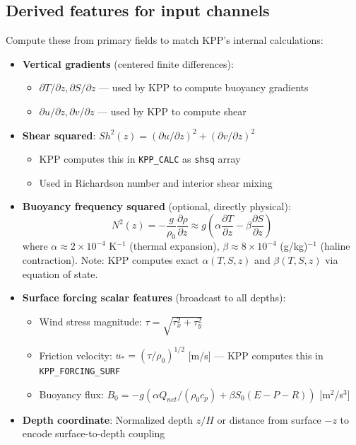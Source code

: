\documentclass[11pt, a4paper]{article}
\begin{document}
\subsection{Derived features for input channels}

Compute these from primary fields to match KPP's internal calculations:

\begin{itemize}
    \item \textbf{Vertical gradients} (centered finite differences):
    \begin{itemize}
        \item $\partial T/\partial z, \partial S/\partial z$ — used by KPP to compute buoyancy gradients
        \item $\partial u/\partial z, \partial v/\partial z$ — used by KPP to compute shear
    \end{itemize}

    \item \textbf{Shear squared}: $Sh^2(z) = (\partial u/\partial z)^2 + (\partial v/\partial z)^2$
    \begin{itemize}
        \item KPP computes this in \texttt{KPP\_CALC} as \texttt{shsq} array
        \item Used in Richardson number and interior shear mixing
    \end{itemize}

    \item \textbf{Buoyancy frequency squared} (optional, directly physical):
    \begin{equation}
    N^2(z) = -\frac{g}{\rho_0}\frac{\partial \rho}{\partial z} \approx g(\alpha \frac{\partial T}{\partial z} - \beta \frac{\partial S}{\partial z})
    \end{equation}
    where $\alpha \approx 2 \times 10^{-4}$ K$^{-1}$ (thermal expansion), $\beta \approx 8 \times 10^{-4}$ (g/kg)$^{-1}$ (haline contraction).
    Note: KPP computes exact $\alpha(T,S,z)$ and $\beta(T,S,z)$ via equation of state.

    \item \textbf{Surface forcing scalar features} (broadcast to all depths):
    \begin{itemize}
        \item Wind stress magnitude: $\tau = \sqrt{\tau_x^2 + \tau_y^2}$
        \item Friction velocity: $u_* = (\tau/\rho_0)^{1/2}$ [m/s] — KPP computes this in \texttt{KPP\_FORCING\_SURF}
        \item Buoyancy flux: $B_0 = -g(\alpha Q_{net}/(\rho_0 c_p) + \beta S_0 (E-P-R))$ [m$^2$/s$^3$]
    \end{itemize}

    \item \textbf{Depth coordinate}: Normalized depth $z/H$ or distance from surface $-z$ to encode surface-to-depth coupling
\end{itemize}
\end{document}

